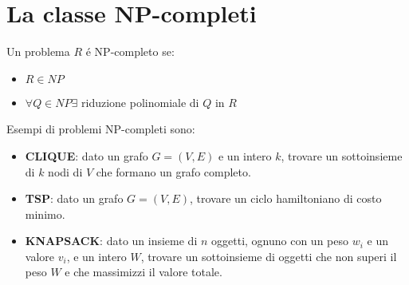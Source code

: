 \section{La classe NP-completi}

Un problema $R$ \'e NP-completo se:
\begin{itemize}
  \item $R \in NP$
\item $\forall Q \in NP \exists $ riduzione polinomiale di $Q$ in $R$
\end{itemize}

Esempi di problemi NP-completi sono:
\begin{itemize}
  \item \textbf{CLIQUE}: dato un grafo $G = (V, E)$ e un intero $k$, trovare un sottoinsieme di $k$ nodi di $V$ che formano un grafo completo.
  \item \textbf{TSP}: dato un grafo $G = (V, E)$, trovare un ciclo hamiltoniano di costo minimo.
  \item \textbf{KNAPSACK}: dato un insieme di $n$ oggetti, ognuno con un peso $w_i$ e un valore $v_i$, e un intero $W$, trovare un sottoinsieme di oggetti che non superi il peso $W$ e che massimizzi il valore totale.
\end{itemize}


